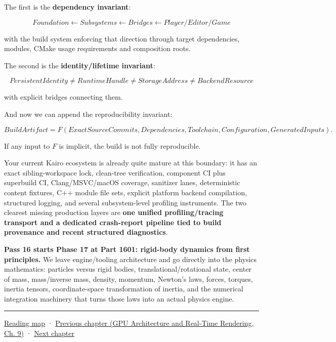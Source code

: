 The first is the \textbf{dependency invariant}:

\[
\boxed{
Foundation
\leftarrow
Subsystems
\leftarrow
Bridges
\leftarrow
Player/Editor/Game
}
\]

with the build system enforcing that direction through target dependencies, modules, CMake usage requirements and composition roots.

The second is the \textbf{identity/lifetime invariant}:

\[
\boxed{
PersistentIdentity
\neq
RuntimeHandle
\neq
StorageAddress
\neq
BackendResource
}
\]

with explicit bridges connecting them.

And now we can append the reproducibility invariant:

\[
\boxed{
BuildArtifact
=
F(
ExactSourceCommits,
Dependencies,
Toolchain,
Configuration,
GeneratedInputs
).
}
\]

If any input to \(F\) is implicit, the build is not fully reproducible.

Your current Kairo ecosystem is already quite mature at this boundary: it has an exact sibling-workspace lock, clean-tree verification, component CI plus superbuild CI, Clang/MSVC/macOS coverage, sanitizer lanes, deterministic content fixtures, C++ module file sets, explicit platform backend compilation, structured logging, and several subsystem-level profiling instruments. The two clearest missing production layers are \textbf{one unified profiling/tracing transport and a dedicated crash-report pipeline tied to build provenance and recent structured diagnostics}.

\textbf{Pass 16 starts Phase 17 at Part 1601: rigid-body dynamics from first principles.} We leave engine/tooling architecture and go directly into the physics mathematics: particles versus rigid bodies, translational/rotational state, center of mass, mass/inverse mass, density, momentum, Newton's laws, forces, torques, inertia tensors, coordinate-space transformation of inertia, and the numerical integration machinery that turns those laws into an actual physics engine.

\begin{center}\rule{0.5\linewidth}{0.5pt}\end{center}

\hyperref[volume-reading-map]{Reading map} · \href{../06-GPU-Architecture-and-Real-Time-Rendering/main.pdf\#nameddest=03-visual-computing-i-ch016-gpu-memory-divergence-and-execution-order}{Previous chapter (GPU Architecture and Real-Time Rendering, Ch. 9)} · \hyperref[03-visual-computing-i-ch018-c-representation-ownership-and-lifetime]{Next chapter}
